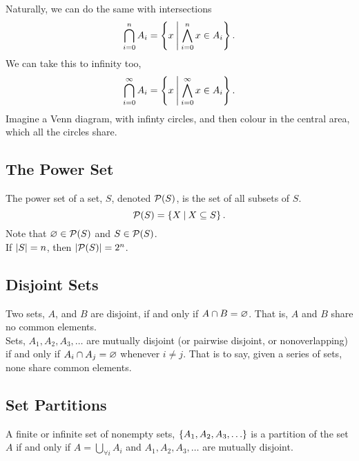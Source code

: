 \documentclass{report}
\begin{document}
Naturally, we can do the same with intersections
$$
	\bigcap_{i=0}^{n}A_i = \left\lbrace x\medspace\middle|\medspace \bigwedge_{i=0}^{n} x\in A_i \right\rbrace.
$$
We can take this to infinity too,
$$
	\bigcap_{i=0}^{\infty}A_i = \left\lbrace x\medspace\middle|\medspace \bigwedge_{i=0}^{\infty} x\in A_i \right\rbrace.
$$
Imagine a Venn diagram, with infinty circles, and then colour in the central area, which all the circles share. 

\subsection*{The Power Set}
The power set of a set, $S$, denoted $\mathcal{P}(S)$, is the set of all subsets of $S$.
$$
	\mathcal{P}(S) = \left\lbrace X \medspace\middle|\medspace X\subseteq S \right\rbrace.
$$
Note that $\varnothing\in\mathcal{P}(S)$ and $S\in\mathcal{P}(S)$. \\
\Claim If $\left| S \right| = n$, then $\left| \mathcal{P}(S) \right| = 2^n$.

\subsection*{Disjoint Sets}
Two sets, $A$, and $B$ are disjoint, if and only if $A\cap B = \varnothing$. That is, $A$ and $B$ share no common elements. \\

Sets, $A_1, A_2, A_3, \dots$ are mutually disjoint (or pairwise disjoint, or nonoverlapping) if and only if $A_i \cap A_j = \varnothing$ whenever $i\neq j$. That is to say, given a series of sets, none share common elements.

\subsection*{Set Partitions}
A finite or infinite set of nonempty sets, $\braces{A_1, A_2, A_3, \dots}$ is a partition of the set $A$ if and only if $A=\bigcup_{\forall i} A_i$ and $A_1, A_2, A_3, \dots$ are mutually disjoint.
\end{document}
